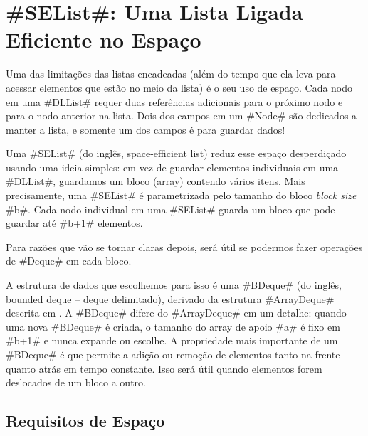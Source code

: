 \section{#SEList#: Uma Lista Ligada Eficiente no Espaço}
%
%
Uma das limitações das listas encadeadas (além do tempo que ela leva para
acessar elementos que estão no meio da lista) é o seu uso de espaço.
Cada nodo em uma #DLList# requer duas referências adicionais para o próximo nodo e para o nodo anterior na lista. Dois dos campos em um #Node# são dedicados a manter a lista, e somente um dos campos é para guardar dados!

Uma #SEList# (do inglês, space-efficient list) reduz esse espaço desperdiçado usando uma ideia simples: 
em vez de guardar elementos individuais em uma #DLList#,
guardamos um bloco (array) contendo vários itens.
Mais precisamente, uma 
#SEList# é parametrizada pelo tamanho do bloco \emph{block size} #b#.
Cada nodo individual em uma #SEList# guarda um bloco que pode guardar até #b+1# elementos.

Para razões que vão se tornar claras depois, será útil se podermos fazer operações de #Deque# em cada bloco.

A estrutura de dados que escolhemos para isso é uma 
#BDeque# (do inglês, bounded deque -- deque delimitado),
%
%
%
%
derivado da estrutura #ArrayDeque#
descrita em . A #BDeque# difere do #ArrayDeque#
em um detalhe: quando uma nova #BDeque# é criada, o tamanho do array de apoio #a#
é fixo em #b+1# e nunca expande ou escolhe.
A propriedade mais importante de um #BDeque# é que permite a adição ou remoção
de elementos tanto na frente quanto atrás em tempo constante.
Isso será útil quando elementos forem deslocados de um bloco a outro.




\subsection{Requisitos de Espaço}

